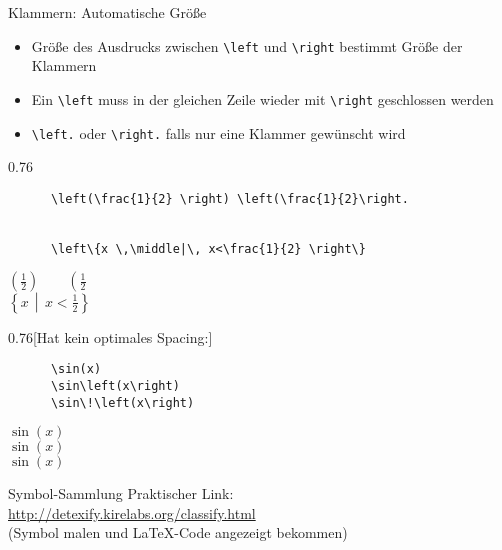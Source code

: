 \begin{frame}[fragile]{Klammern: Automatische Größe}
  \begin{itemize}
    \item Größe des Ausdrucks zwischen \lstinline+\left+ und \lstinline+\right+ bestimmt Größe der Klammern
    \item Ein \lstinline+\left+ muss in der gleichen Zeile wieder mit \lstinline+\right+ geschlossen werden
    \item \lstinline+\left.+ oder \lstinline+\right.+ falls nur eine Klammer gewünscht wird
  \end{itemize}
  \begin{CodeExample}{0.76}
    \begin{lstlisting}
      \left(\frac{1}{2} \right) \left(\frac{1}{2}\right.


      \left\{x \,\middle|\, x<\frac{1}{2} \right\}
    \end{lstlisting}
  \CodeResult
    $\left(\frac{1}{2}\right) \qquad \left(\frac{1}{2}\right.$ \\[2\baselineskip]
      $\left\{ x \, \middle| \, x < \frac{1}{2} \right\}$
  \end{CodeExample}

  \begin{CodeExample}{0.76}[Hat kein optimales Spacing:]
    \begin{lstlisting}
      \sin(x)
      \sin\left(x\right)
      \sin\!\left(x\right)
    \end{lstlisting}
  \CodeResult
    \strut
    $\sin(x)$ \\
    $\sin\left(x\right)$ \\
    $\sin\!\left(x\right)$
  \end{CodeExample}
\end{frame}

\begin{frame}[fragile]{
  Symbol-Sammlung
  \hfill
}
  Praktischer Link: \\
  \href{http://detexify.kirelabs.org/classify.html}{http://detexify.kirelabs.org/classify.html} \\
  (Symbol malen und \LaTeX-Code angezeigt bekommen)
\end{frame}


